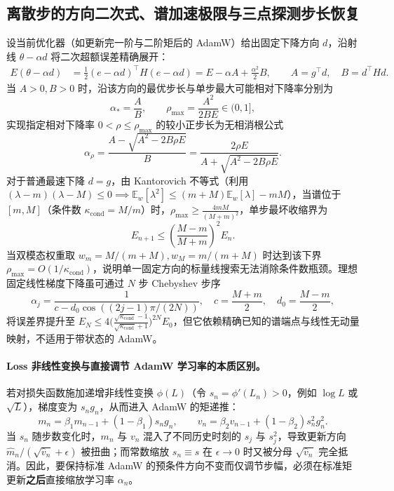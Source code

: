 \documentclass[lang=cn,scheme=chinese,openany]{elegantbook}
\newcommand{\E}{\mathbb E}
\begin{document}
\subsection{离散步的方向二次式、谱加速极限与三点探测步长恢复}

设当前优化器（如更新完一阶与二阶矩后的 AdamW）给出固定下降方向 $d$，沿射线 $\theta-\alpha d$ 将二次超额误差精确展开：
\begin{align}
E(\theta-\alpha d)
&=\frac12(e-\alpha d)^\top H(e-\alpha d)
=E-\alpha A+\frac{\alpha^2}2 B,
\qquad A=g^\top d,\quad B=d^\top H d.
\label{dyn:scalar-ray}
\end{align}
当 $A>0, B>0$ 时，沿该方向的最优步长与单步最大可能相对下降率分别为
\begin{equation}
\alpha_*=\frac AB,\qquad
\rho_{\max}=\frac{A^2}{2BE}\in(0,1],
\end{equation}
实现指定相对下降率 $0<\rho\le\rho_{\max}$ 的较小正步长为无相消根公式
\begin{equation}
\alpha_\rho=\frac{A-\sqrt{A^2-2B\rho E}}B
=\frac{2\rho E}{A+\sqrt{A^2-2B\rho E}}.
\end{equation}
对于普通最速下降 $d=g$，由 Kantorovich 不等式（利用 $(\lambda-m)(\lambda-M)\le 0\implies \E_w[\lambda^2]\le (m+M)\E_w[\lambda]-mM$），当谱位于 $[m,M]$（条件数 $\kappa_{\mathrm{cond}}=M/m$）时，$\rho_{\max}\ge \frac{4mM}{(M+m)^2}$，单步最坏收缩界为
\begin{equation}
E_{n+1}\le\left(\frac{M-m}{M+m}\right)^2E_n.
\end{equation}
当双模态权重取 $w_m=M/(m+M), w_M=m/(m+M)$ 时达到该下界 $\rho_{\max}=O(1/\kappa_{\mathrm{cond}})$，说明单一固定方向的标量线搜索无法消除条件数瓶颈。理想固定线性梯度下降虽可通过 $N$ 步 Chebyshev 步序
\begin{equation}
\alpha_j=\frac{1}{c-d_0\cos((2j-1)\pi/(2N))},\quad
c=\frac{M+m}{2},\quad d_0=\frac{M-m}{2},
\end{equation}
将误差界提升至 $E_N\le 4\bigl(\frac{\sqrt{\kappa_{\mathrm{cond}}}-1}{\sqrt{\kappa_{\mathrm{cond}}}+1}\bigr)^{2N}E_0$，但它依赖精确已知的谱端点与线性无动量映射，不适用于带状态的 AdamW。

\paragraph{Loss 非线性变换与直接调节 AdamW 学习率的本质区别。}
若对损失函数施加递增非线性变换 $\phi(L)$（令 $s_n=\phi'(L_n)>0$，例如 $\log L$ 或 $\sqrt{L}$），梯度变为 $s_n g_n$，从而进入 AdamW 的矩递推：
\begin{equation}
m_n=\beta_1 m_{n-1}+(1-\beta_1)s_n g_n,\qquad
v_n=\beta_2 v_{n-1}+(1-\beta_2)s_n^2 g_n^2.
\end{equation}
当 $s_n$ 随步数变化时，$m_n$ 与 $v_n$ 混入了不同历史时刻的 $s_j$ 与 $s_j^2$，导致更新方向 $\widehat m_n/(\sqrt{\widehat v_n}+\epsilon)$ 被扭曲；而常数缩放 $s_n\equiv s$ 在 $\epsilon\to 0$ 时又被分母 $\sqrt{\widehat v_n}$ 完全抵消。因此，要保持标准 AdamW 的预条件方向不变而仅调节步幅，必须在标准矩更新\textbf{之后}直接缩放学习率 $\alpha_n$。
\end{document}
